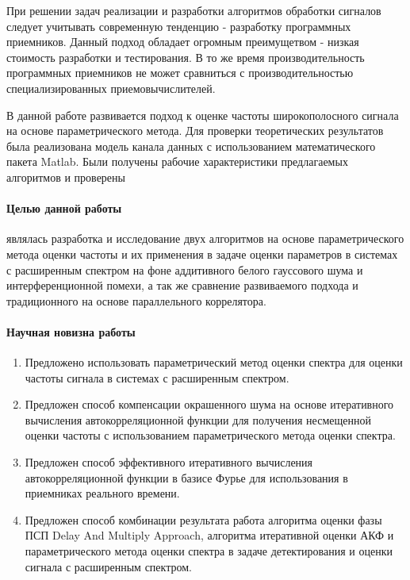 При решении задач реализации и разработки алгоритмов обработки сигналов следует учитывать современную тенденцию - разработку
программных приемников. Данный подход обладает огромным преимущетвом - низкая стоимость разработки и тестирования. В то же
время производительность программных приемников не может сравниться с производительностью специализированных приемовычислителей.

В данной работе развивается подход к оценке частоты широкополосного сигнала на основе параметрического метода. Для проверки
теоретических результатов была реализована модель канала данных с использованием математического пакета Matlab. Были получены
рабочие характеристики предлагаемых алгоритмов и проверены 

\paragraph{Целью данной работы} являлась разработка и исследование двух алгоритмов на основе параметрического метода оценки частоты 
и их применения в задаче оценки параметров в системах с расширенным спектром на фоне аддитивного белого гауссового шума и интерференционной помехи,
а так же сравнение развиваемого подхода и традиционного на основе параллельного коррелятора.

\paragraph{Научная новизна работы}
\begin{enumerate}
	\item{Предложено использовать параметрический метод оценки спектра для оценки частоты сигнала в системах с расширенным спектром.}
	\item{Предложен способ компенсации окрашенного шума на основе итеративного вычисления автокорреляционной функции для
		получения несмещенной оценки частоты с использованием параметрического метода оценки спектра.}
	\item{Предложен способ эффективного итеративного вычисления автокорреляционной функции в базисе Фурье для использования в приемниках реального времени.}
	\item{Предложен способ комбинации результата работа алгоритма оценки фазы ПСП Delay And Multiply Approach, алгоритма итеративной оценки АКФ и
		параметрического метода оценки спектра в задаче детектирования и оценки сигнала с расширенным спектром.}
\end{enumerate}

